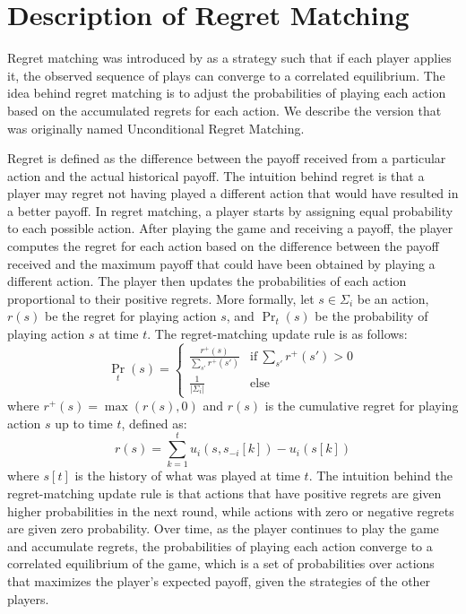 \documentclass[preprint,12pt,authoryear,doubleblind]{elsarticle}
\theoremstyle{definition}
\begin{document}
\section{Description of Regret Matching}
\label{sec:regret}

Regret matching was introduced by \citet{Hart1997-nk} as a strategy such that if each player applies it, the observed sequence of plays can converge to a correlated equilibrium. The idea behind regret matching is to adjust the probabilities of playing each action based on the accumulated regrets for each action. We describe the version that was originally named Unconditional Regret Matching.

Regret is defined as the difference between the payoff received from a particular action and the actual historical payoff. The intuition behind regret is that a player may regret not having played a different action that would have resulted in a better payoff.
In regret matching, a player starts by assigning equal probability to each possible action. After playing the game and receiving a payoff, the player computes the regret for each action based on the difference between the payoff received and the maximum payoff that could have been obtained by playing a different action. The player then updates the probabilities of each action proportional to their positive regrets.
More formally, let $s \in \Sigma_i$ be an action, $r(s)$ be the regret for playing action $s$, and $\Pr_t(s)$ be the probability of playing action $s$ at time $t$. The regret-matching update rule is as follows:
$${\Pr}_{t}(s) = \begin{cases} \frac{r^+(s)}{\sum_{s'} r^+(s')} &\text{if}~\sum_{s'} r^+(s') > 0\\
\frac{1}{|\Sigma_i|} &\text{else} \end{cases}$$
where $r^+(s) =\max(r(s), 0)$ and $r(s)$ is the cumulative regret for playing action $s$ up to time $t$, defined as:
$$r(s) = \sum_{k=1}^t u_i(s, s_{-i}[k]) - u_i(s[k])$$
where $s[t]$ is the history of what was played at time $t$.
The intuition behind the regret-matching update rule is that actions that have positive regrets are given higher probabilities in the next round, while actions with zero or negative regrets are given zero probability. Over time, as the player continues to play the game and accumulate regrets, the probabilities of playing each action converge to a correlated equilibrium of the game, which is a set of probabilities over actions that maximizes the player's expected payoff, given the strategies of the other players.
\end{document}
